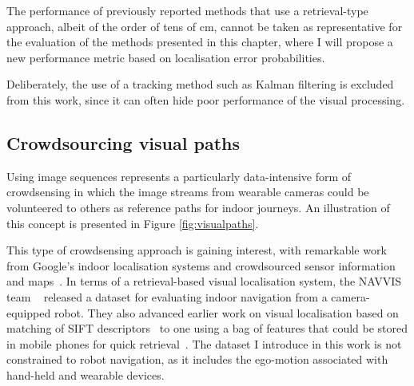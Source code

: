 The performance of previously reported methods that use a retrieval-type approach, albeit of the order of tens of cm, cannot be taken as representative for the evaluation of the methods presented in this chapter, where I will propose a new performance metric based on localisation error probabilities. 

Deliberately, the use of a tracking method such as Kalman filtering is excluded from this work, since it can often hide poor performance of the visual processing. 

\subsection{Crowdsourcing visual paths}
\label{subsec:visual_paths}

Using image sequences represents a particularly data-intensive form of crowdsensing in which the image streams  from wearable cameras could be volunteered to others as reference paths for indoor journeys. An illustration of this concept is presented in Figure \ref{fig:visualpaths}. 

This type of crowdsensing approach is gaining interest, with remarkable work from Google's indoor localisation systems and crowdsourced sensor information and maps~\cite{Kadous2013}. In terms of a retrieval-based visual localisation system, the NAVVIS team ~\cite{Huitl2012} released a dataset for evaluating indoor navigation from a camera-equipped robot. They also advanced earlier work on visual localisation based on matching of SIFT descriptors~\cite{Park2008} to one using a bag of features that could be stored in mobile phones for quick retrieval~\cite{Schroth2011,Schroth2012}. The dataset I introduce in this work is not constrained to robot navigation, as it includes the ego-motion associated with hand-held and wearable devices.



